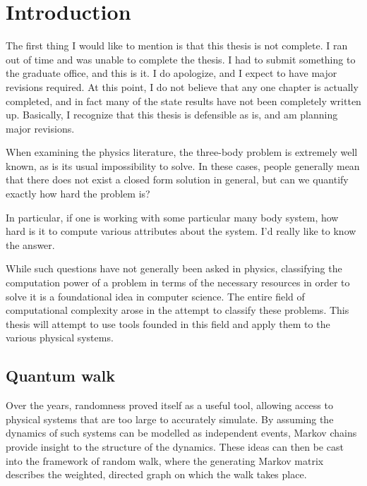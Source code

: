 \documentclass[../thesis-main/thesis-main]{subfiles}
\begin{document}
\chapter{Introduction}
\label{chap:introduction}

The first thing I would like to mention is that this thesis is not complete.  I ran out of time and was unable to complete the thesis.  I had to submit something to the graduate office, and this is it.  I do apologize, and I expect to have major revisions required.  At this point, I do not believe that any one chapter is actually completed, and in fact many of the state results have not been completely written up.  Basically, I recognize that this thesis is defensible as is, and am planning major revisions.  


When examining the physics literature, the three-body problem is extremely well known, as is its usual impossibility to solve.  In these cases, people generally mean that there does not exist a closed form solution in general, but can we quantify exactly how hard the problem is?

In particular, if one is working with some particular many body system, how hard is it to compute various attributes about the system.  I'd really like to know the answer.

While such questions have not generally been asked in physics, classifying the computation power of a problem in terms of the necessary resources in order to solve it is a foundational idea in computer science.  The entire field of computational complexity arose in the attempt to classify these problems.  This thesis will attempt to use tools founded in this field and apply them to the various physical systems.





\section{Quantum walk}
Over the years, randomness proved itself as a useful tool, allowing access to physical systems that are too large to accurately simulate.  By assuming the dynamics of such systems can be modelled as independent events, Markov chains provide insight to the structure of the dynamics.  These ideas can then be cast into the framework of random walk, where the generating Markov matrix describes the weighted, directed graph on which the walk takes place.  
\end{document}
